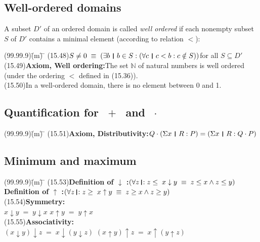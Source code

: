 \documentclass{amsart}
\newcommand{\lgap}{2pt}                             %
\newcommand{\equivs}{\ensuremath{\;\equiv\;}}       %
\newcommand{\thedr}{\rule[-.25ex]{.32mm}{1.75ex}}   %
\newcommand{\dr}{\;\,\thedr\,\;}                    %
\newcommand{\rb}{:}                                 %
\newcommand{\drrb}{\;\thedr\,{:}\;}                 %
\newcommand{\all}{\forall}                          %
\newcommand{\ext}{\exists}                          %
\begin{document}
\subsection*{Well-ordered domains}
A subset $D'$ of an ordered domain is called \emph{well ordered} if each nonempty subset $S$ of $D'$
contains a minimal element (according to relation $<$):
\begin{tabbing}
(99.99.9)\;\=(m)\;\= \makebox[2in]{ } \= \kill
(15.48)\>$S \ne 0 \equivs (\ext b\dr b \in S \rb (\all c \dr c < b \rb c \notin S))$\quad for all $S \subseteq D'$\\[\lgap]
(15.49)\>\textbf{Axiom, Well ordering:}\quad The set $\mathbb{N}$ of natural numbers is well ordered\\[\lgap]
       \>(under the ordering $<$ defined in (15.36)).\\[\lgap]
(15.50)\>In a well-ordered domain, there is no element between 0 and 1.\\[\lgap]
\end{tabbing}

\subsection*{Quantification for $\;+\;$ and $\;\cdot\;$}
\begin{tabbing}
(99.99.9)\;\=(m)\;\= \makebox[2in]{ } \= \kill
(15.51)\>\textbf{Axiom, Distributivity:}\quad $Q \cdot (\Sigma x \dr R \rb P) = (\Sigma x \dr R \rb Q \cdot P)$\\[\lgap]
\end{tabbing}

\subsection*{Minimum and maximum}
\begin{tabbing}
(99.99.9)\;\=(m)\;\= \makebox[2in]{ } \= \kill
(15.53)\>\textbf{Definition of $\downarrow$ :}\quad $(\all z\drrb z\le \;x\downarrow y\equivs z\le x \land z\le y)$\\[\lgap]
       \>\textbf{Definition of $\uparrow$ :}\quad $(\all z\drrb z\ge \;x\uparrow y\equivs z\ge x \land z\ge y)$\\[\lgap]
(15.54)\>\textbf{Symmetry:}\\[\lgap]
       \>$x\downarrow y \;=\; y\downarrow x$ \>\> $x\uparrow y \;=\; y\uparrow x$\\[\lgap]
(15.55)\>\textbf{Associativity:}\\[\lgap]
       \>$(x\downarrow y)\downarrow z \;=\; x\downarrow (y\downarrow z)$ \>\> $(x\uparrow y)\uparrow z \;=\; x\uparrow (y\uparrow z)$\\[\lgap]
\end{tabbing}
\end{document}
